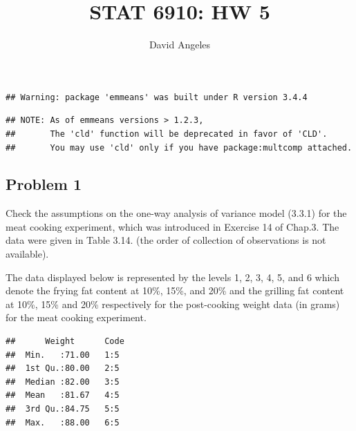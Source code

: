 \documentclass[12pt,]{article}
\title{STAT 6910: HW 5}
\author{David Angeles}
\date{}
\newenvironment{Shaded}{\begin{snugshade}}{\end{snugshade}}
\newcommand{\KeywordTok}[1]{\textcolor[rgb]{0.13,0.29,0.53}{\textbf{#1}}}
\newcommand{\StringTok}[1]{\textcolor[rgb]{0.31,0.60,0.02}{#1}}
\newcommand{\OperatorTok}[1]{\textcolor[rgb]{0.81,0.36,0.00}{\textbf{#1}}}
\newcommand{\NormalTok}[1]{#1}
\begin{document}
\maketitle

\begin{verbatim}
## Warning: package 'emmeans' was built under R version 3.4.4
\end{verbatim}

\begin{verbatim}
## NOTE: As of emmeans versions > 1.2.3,
##       The 'cld' function will be deprecated in favor of 'CLD'.
##       You may use 'cld' only if you have package:multcomp attached.
\end{verbatim}

\subsection{Problem 1}\label{problem-1}

Check the assumptions on the one-way analysis of variance model (3.3.1)
for the meat cooking experiment, which was introduced in Exercise 14 of
Chap.3. The data were given in Table 3.14. (the order of collection of
observations is not available).

The data displayed below is represented by the levels 1, 2, 3, 4, 5, and
6 which denote the frying fat content at 10\%, 15\%, and 20\% and the
grilling fat content at 10\%, 15\% and 20\% respectively for the
post-cooking weight data (in grams) for the meat cooking experiment.

\begin{Shaded}
\end{Shaded}

\begin{verbatim}
##      Weight      Code 
##  Min.   :71.00   1:5  
##  1st Qu.:80.00   2:5  
##  Median :82.00   3:5  
##  Mean   :81.67   4:5  
##  3rd Qu.:84.75   5:5  
##  Max.   :88.00   6:5
\end{verbatim}
\end{document}
